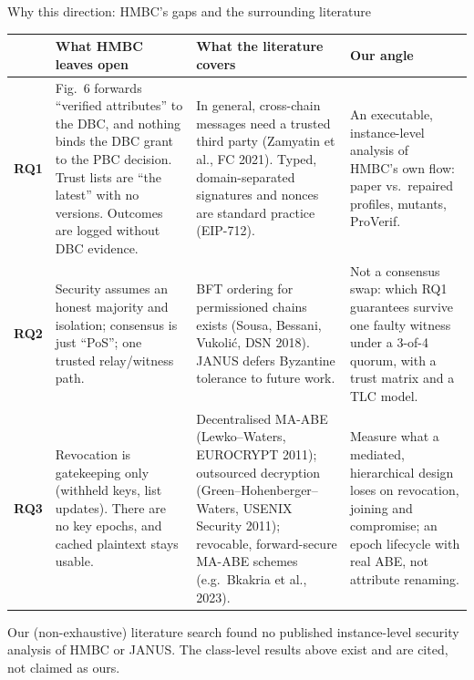 \documentclass[aspectratio=169,10pt]{beamer}
\begin{document}
\begin{frame}{Why this direction: HMBC's gaps and the surrounding literature}
\scriptsize
\renewcommand{\arraystretch}{1.25}
\begin{tabular}{@{}>{\bfseries}L{0.07\textwidth} L{0.29\textwidth} L{0.32\textwidth} L{0.28\textwidth}@{}}
\toprule
 & \textbf{What HMBC leaves open} & \textbf{What the literature covers} & \textbf{Our angle} \\
\midrule
\textcolor{accent}{RQ1} & Fig.~6 forwards “verified attributes” to the DBC, and nothing binds the DBC grant to the PBC decision. Trust lists are “the latest” with no versions. Outcomes are logged without DBC evidence. & In general, cross-chain messages need a trusted third party (Zamyatin et al., FC 2021). Typed, domain-separated signatures and nonces are standard practice (EIP-712). & An executable, instance-level analysis of HMBC's own flow: paper vs.\ repaired profiles, mutants, ProVerif. \\
\textcolor{pbc}{RQ2} & Security assumes an honest majority and isolation; consensus is just “PoS”; one trusted relay/witness path. & BFT ordering for permissioned chains exists (Sousa, Bessani, Vukolić, DSN 2018). JANUS defers Byzantine tolerance to future work. & Not a consensus swap: which RQ1 guarantees survive one faulty witness under a 3-of-4 quorum, with a trust matrix and a TLC model. \\
\textcolor{dbc}{RQ3} & Revocation is gatekeeping only (withheld keys, list updates). There are no key epochs, and cached plaintext stays usable. & Decentralised MA-ABE (Lewko–Waters, EUROCRYPT 2011); outsourced decryption (Green–Hohenberger–Waters, USENIX Security 2011); revocable, forward-secure MA-ABE schemes (e.g.\ Bkakria et al., 2023). & Measure what a mediated, hierarchical design loses on revocation, joining and compromise; an epoch lifecycle with real ABE, not attribute renaming. \\
\bottomrule
\end{tabular}

\vspace{0.6em}
\tiny\color{datagray} Our (non-exhaustive) literature search found no published instance-level security analysis of HMBC or JANUS. The class-level results above exist and are cited, not claimed as ours.
\end{frame}
\end{document}
